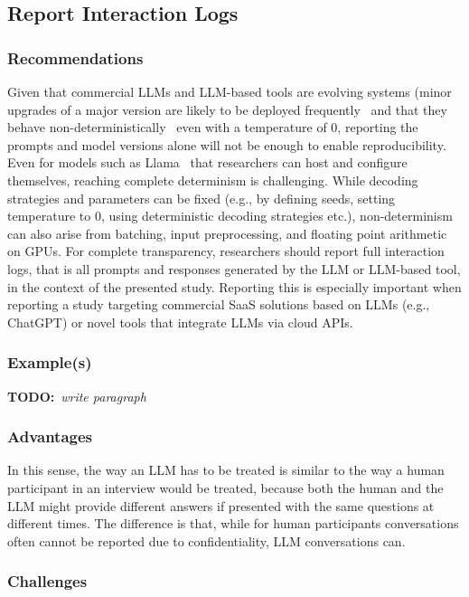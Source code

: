 \documentclass[11pt]{article}
\newcommand{\todo}[1]{{\textbf{TODO:}\ \textit{#1}}} %
\begin{document}
\subsection{Report Interaction Logs}

\subsubsection{Recommendations}

Given that commercial LLMs and LLM-based tools are evolving systems (minor upgrades of a major version are likely to be deployed frequently~\cite{DBLP:journals/corr/abs-2307-09009} and that they behave non-deterministically~\cite{Chann2023} even with a temperature of 0, reporting the prompts and model versions alone will not be enough to enable reproducibility.
Even for models such as Llama~\cite{Meta2025} that researchers can host and configure themselves, reaching complete determinism is challenging.
While decoding strategies and parameters can be fixed (e.g., by defining seeds, setting temperature to 0, using deterministic decoding strategies etc.), non-determinism can also arise from batching, input preprocessing, and floating point arithmetic on GPUs.
For complete transparency, researchers should report full interaction logs, that is all prompts and responses generated by the LLM or LLM-based tool, in the context of the presented study.
Reporting this is especially important when reporting a study targeting commercial SaaS solutions based on LLMs (e.g., ChatGPT) or novel tools that integrate LLMs via cloud APIs.


\subsubsection{Example(s)}

\todo{write paragraph}


\subsubsection{Advantages}

In this sense, the way an LLM has to be treated is similar to the way a human participant in an interview would be treated, because both the human and the LLM might provide different answers if presented with the same questions at different times.
The difference is that, while for human participants conversations often cannot be reported due to confidentiality, LLM conversations can.


\subsubsection{Challenges}
\end{document}
